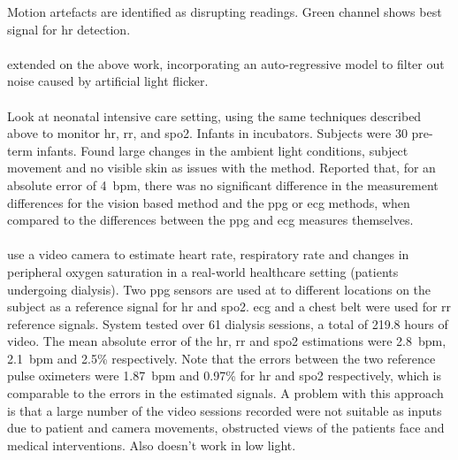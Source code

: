 \documentclass[11pt, parskip=half*,twoside=false]{scrbook}
\begin{document}
Motion artefacts are identified as disrupting readings. Green channel shows best signal for \gls{hr} detection.

\paragraph{\citet{tarassenkoNoncontactVideobasedVital2014}} extended on the above work, incorporating an auto-regressive model to filter out noise caused by artificial light flicker. 

\paragraph{\citet{villarroelContinuousNoncontactVital2014}} Look at neonatal intensive care setting, using the same techniques described above to monitor \gls{hr}, \gls{rr}, and \gls{spo2}. Infants in incubators. Subjects were 30 pre-term infants. Found large changes in the ambient light conditions, subject movement and no visible skin as issues with the method. Reported that, for an absolute error of 4~\gls{bpm}, there was no significant difference in the measurement differences for the vision based method and the \gls{ppg} or \gls{ecg} methods, when compared to the differences between the \gls{ppg} and \gls{ecg} measures themselves.

\paragraph{\citet{villarroelNonContactVitalSign2017}} use a video camera to estimate heart rate, respiratory rate and changes in peripheral oxygen saturation in a real-world healthcare setting (patients undergoing dialysis). Two \gls{ppg} sensors are used at to different locations on the subject as a reference signal for \gls{hr} and \gls{spo2}. \gls{ecg} and a chest belt were used for \gls{rr} reference signals. System tested over 61 dialysis sessions, a total of 219.8 hours of video. The mean absolute error of the \gls{hr}, \gls{rr} and \gls{spo2} estimations were 2.8~\gls{bpm}, 2.1~\gls{bpm} and 2.5\% respectively. Note that the errors between the two reference pulse oximeters were 1.87~\gls{bpm} and 0.97\% for \gls{hr} and \gls{spo2} respectively, which is comparable to the errors in the estimated signals.  A problem with this approach is that a large number of the video sessions recorded were not suitable as inputs due to patient and camera movements, obstructed views of the patients face and medical interventions. Also doesn't work in low light.
\end{document}
